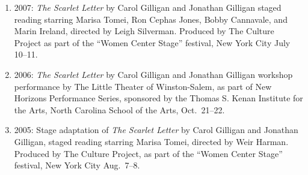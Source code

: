 \begin{enumerate}
\item 2007: \emph{The Scarlet Letter\/} by Carol Gilligan and Jonathan Gilligan staged reading starring Marisa Tomei, Ron Cephas Jones, Bobby Cannavale, and Marin Ireland, directed by Leigh Silverman. Produced by The Culture Project as part of the ``Women Center Stage'' festival, New York City July 10--11.
\item 2006: \emph{The Scarlet Letter\/} by Carol Gilligan and Jonathan Gilligan workshop performance by The Little Theater of Winston-Salem, as part of New Horizons Performance Series, sponsored by the Thomas S. Kenan Institute for the Arts, North Carolina School of the Arts, Oct.~21--22.
\item 2005: Stage adaptation of \emph{The Scarlet Letter\/} by Carol Gilligan and Jonathan Gilligan, staged reading starring Marisa Tomei, directed by Weir Harman. Produced by The Culture Project, as part of the ``Women Center Stage'' festival, New York City Aug.\ 7--8.
\end{enumerate}